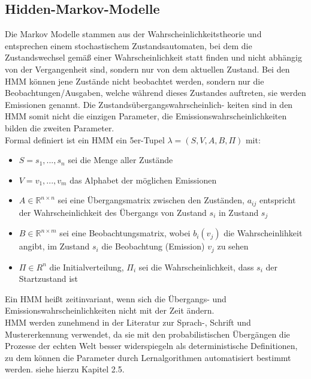 \subsection{Hidden-Markov-Modelle}
\label{sec:hiddenmarkovmodel}

Die Markov Modelle stammen aus der Wahrscheinlichkeitstheorie und entsprechen einem stochastischem Zustandsautomaten, bei dem die Zustandswechsel gemäß einer Wahrscheinlichkeit statt finden und nicht abhängig von der Vergangenheit sind, sondern nur von dem aktuellen Zustand.
Bei den HMM\cite{Stamp04arevealing} können jene Zustände nicht beobachtet werden, sondern nur die Beobachtungen/Ausgaben, welche während dieses Zustandes auftreten, sie werden Emissionen genannt.
Die Zustandsübergangswahrscheinlich- keiten sind in den HMM somit nicht die einzigen Parameter, die Emissionswahrscheinlichkeiten bilden die zweiten Parameter.\\
Formal definiert ist ein HMM ein 5er-Tupel $\lambda= (S, V, A, B, \Pi)$ mit:
\begin{itemize}
 \item $S = {s_1,..., s_n}$ sei die Menge aller Zustände
 \item $V = {v_1,..., v_m}$ das Alphabet der möglichen Emissionen
 \item $A \in \mathbb{R}^{n \times n}$ sei eine Übergangsmatrix zwischen den Zuständen, $a_{ij}$ entspricht der Wahrscheinlichkeit des Übergangs von Zustand $s_i$ in Zustand $s_j$
 \item $B \in \mathbb{R}^{n\times m}$ sei eine Beobachtungsmatrix, wobei $b_i(v_j)$ die Wahrscheinlihkeit angibt, im Zustand $s_i$ die Beobachtung (Emission) $v_j$ zu sehen
 \item $\Pi \in R^n$ die Initialverteilung, $\Pi_i$ sei die Wahrscheinlichkeit, dass $s_i$ der Startzustand ist
\end{itemize}
Ein HMM heißt zeitinvariant, wenn sich die Übergangs- und Emissionswahrscheinlichkeiten nicht mit der Zeit ändern.\\
HMM werden zunehmend in der Literatur zur Sprach-, Schrift und Mustererkennung \cite{Gales:2007:AHM:1373536.1373537}\cite{Yang1995161} verwendet, da sie mit den probabilistischen Übergängen die Prozesse der echten Welt besser widerspiegeln als deterministische Definitionen, zu dem können die Parameter durch Lernalgorithmen automatisiert bestimmt werden.
 siehe hierzu Kapitel 2.5.
